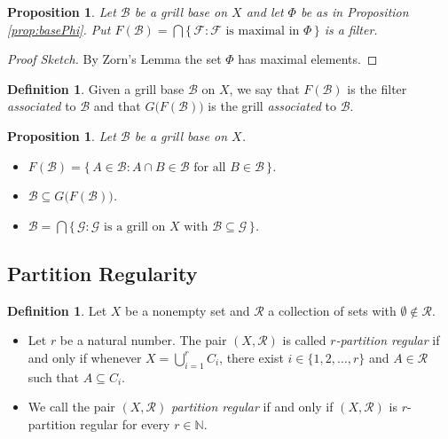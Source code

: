 \documentclass[12pt]{article}
\theoremstyle{plain}
\newtheorem{prop}[thm]{Proposition}
\theoremstyle{definition}
\newtheorem{defn}[thm]{Definition}
\newcommand{\bbN}{\mathbb{N}}
\newcommand{\calB}{\mathcal{B}}
\newcommand{\calF}{\mathcal{F}}
\newcommand{\calG}{\mathcal{G}}
\newcommand{\calR}{\mathcal{R}}
\begin{document}
\begin{prop}
  Let $\calB$ be a grill base on $X$ and let $\Phi$ be as in
  Proposition \ref{prop:basePhi}.
  Put $F(\calB) = \bigcap\{\, \calF : \calF \mbox{ is maximal in }
  \Phi \,\}$ is a filter.
\end{prop}
\begin{proof}[Proof Sketch]
  By Zorn's Lemma the set $\Phi$ has maximal elements.
\end{proof}

\begin{defn}
  Given a grill base $\calB$ on $X$, we say that $F(\calB)$ is the
  filter \textsl{associated} to $\calB$ and that
  $G\bigl(F(\calB)\bigr)$ is the grill \textsl{associated} to $\calB$.
\end{defn}

\begin{prop}
  Let $\calB$ be a grill base on $X$.
  \begin{itemize}
    \item[(a)] $F(\calB) = \{\, A \in \calB : A \cap B \in \calB
      \mbox{ for all } B \in \calB \,\}$.

    \item[(b)] $\calB \subseteq G\bigl(F(\calB)\bigr)$.

    \item[(c)] $\calB = \bigcap\{\, \calG : \calG \mbox{ is a grill on }
      X \mbox{ with } \calB \subseteq \calG \,\}$.
  \end{itemize}
\end{prop}

\subsection{Partition Regularity}

\begin{defn}
  Let $X$ be a nonempty set and $\calR$ a collection of sets with
  $\emptyset\not\in \calR$. 
  \begin{itemize}
    \item[(a)] Let $r$ be a natural number. 
      The pair $(X, \calR)$ is called \textsl{\mbox{$r$-partition}
        regular} if and only if whenever $X = \bigcup_{i=1}^r
      C_i$, there exist $i \in \{1, 2, \ldots, r\}$ and $A \in \calR$
      such that $A \subseteq C_i$.

    \item[(b)] We call the pair $(X, \calR)$ \textsl{partition
        regular} if and only if $(X, \calR)$ is \mbox{$r$-partition}
      regular for every $r \in \bbN$.
  \end{itemize}
\end{defn}
\end{document}

